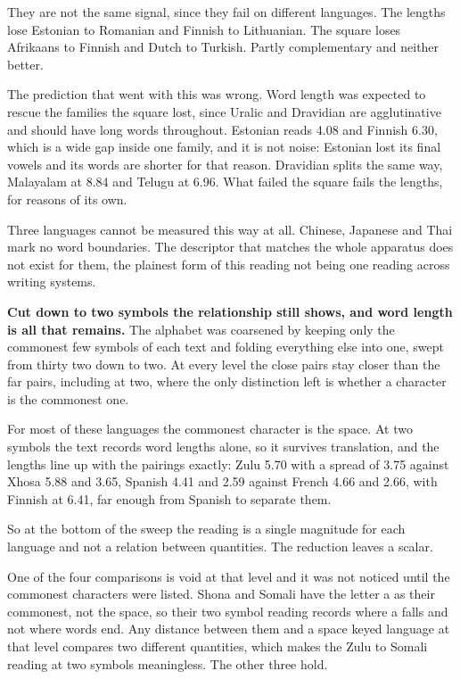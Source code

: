 They are not the same signal, since they fail on different languages. The lengths lose Estonian to Romanian and Finnish to Lithuanian. The square loses Afrikaans to Finnish and Dutch to Turkish. Partly complementary and neither better.

The prediction that went with this was wrong. Word length was expected to rescue the families the square lost, since Uralic and Dravidian are agglutinative and should have long words throughout. Estonian reads 4.08 and Finnish 6.30, which is a wide gap inside one family, and it is not noise: Estonian lost its final vowels and its words are shorter for that reason. Dravidian splits the same way, Malayalam at 8.84 and Telugu at 6.96. What failed the square fails the lengths, for reasons of its own.

Three languages cannot be measured this way at all. Chinese, Japanese and Thai mark no word boundaries. The descriptor that matches the whole apparatus does not exist for them, the plainest form of this reading not being one reading across writing systems.

\textbf{Cut down to two symbols the relationship still shows, and word length is all that remains.} The alphabet was coarsened by keeping only the commonest few symbols of each text and folding everything else into one, swept from thirty two down to two. At every level the close pairs stay closer than the far pairs, including at two, where the only distinction left is whether a character is the commonest one.

For most of these languages the commonest character is the space. At two symbols the text records word lengths alone, so it survives translation, and the lengths line up with the pairings exactly: Zulu 5.70 with a spread of 3.75 against Xhosa 5.88 and 3.65, Spanish 4.41 and 2.59 against French 4.66 and 2.66, with Finnish at 6.41, far enough from Spanish to separate them.

So at the bottom of the sweep the reading is a single magnitude for each language and not a relation between quantities. The reduction leaves a scalar.

One of the four comparisons is void at that level and it was not noticed until the commonest characters were listed. Shona and Somali have the letter a as their commonest, not the space, so their two symbol reading records where a falls and not where words end. Any distance between them and a space keyed language at that level compares two different quantities, which makes the Zulu to Somali reading at two symbols meaningless. The other three hold.

